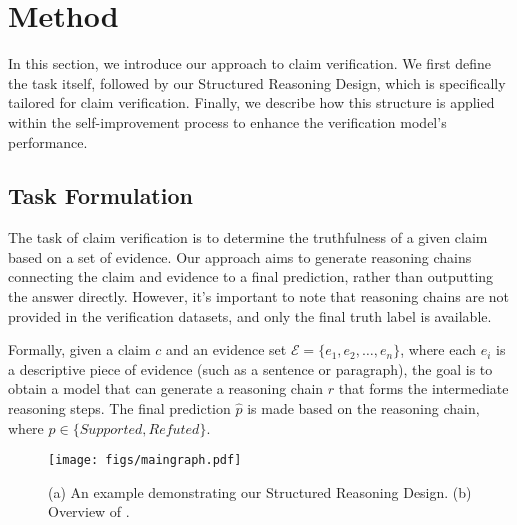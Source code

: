 





\section{Method}
In this section, we introduce our approach to claim verification. We first define the task itself, followed by our Structured Reasoning Design, which is specifically tailored for claim verification. Finally, we describe how this structure is applied within the self-improvement process to enhance the verification model’s performance.



\subsection{Task Formulation}
The task of claim verification is to determine the truthfulness of a given claim based on a set of evidence. Our approach aims to generate reasoning chains connecting the claim and evidence to a final prediction, rather than outputting the answer directly. However, it’s important to note that reasoning chains are not provided in the verification datasets, and only the final truth label is available.

Formally, given a claim $c$ and an evidence set $\mathcal{E} = \{e_1, e_2, \dots, e_n\}$, where each $e_i$ is a descriptive piece of evidence (such as a sentence or paragraph), the goal is to obtain a model that can generate a reasoning chain $r$ that forms the intermediate reasoning steps. The final prediction $\hat p$ is made based on the reasoning chain, where $\hat p \in \{\textit{Supported}, \textit{Refuted}\}$.

\begin{figure}[tb]
  \texttt{[image: figs/maingraph.pdf]}
  \caption{(a) An example demonstrating our Structured Reasoning Design. (b) Overview of \themodel.}
  \label{fig:main}
\end{figure}

